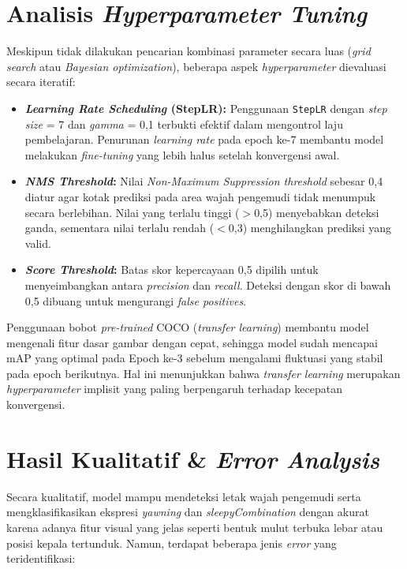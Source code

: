 \documentclass[11pt,a4paper,oneside]{report}
\begin{document}
\section{Analisis \textit{Hyperparameter Tuning}}

Meskipun tidak dilakukan pencarian kombinasi parameter secara luas (\textit{grid search} atau \textit{Bayesian optimization}), beberapa aspek \textit{hyperparameter} dievaluasi secara iteratif:

\begin{itemize}[leftmargin=*]
    \item \textbf{\textit{Learning Rate Scheduling} (StepLR):} Penggunaan \texttt{StepLR} dengan \textit{step size} = 7 dan \textit{gamma} = 0,1 terbukti efektif dalam mengontrol laju pembelajaran. Penurunan \textit{learning rate} pada epoch ke-7 membantu model melakukan \textit{fine-tuning} yang lebih halus setelah konvergensi awal.
    \item \textbf{\textit{NMS Threshold}:} Nilai \textit{Non-Maximum Suppression threshold} sebesar 0,4 diatur agar kotak prediksi pada area wajah pengemudi tidak menumpuk secara berlebihan. Nilai yang terlalu tinggi ($>$0,5) menyebabkan deteksi ganda, sementara nilai terlalu rendah ($<$0,3) menghilangkan prediksi yang valid.
    \item \textbf{\textit{Score Threshold}:} Batas skor kepercayaan 0,5 dipilih untuk menyeimbangkan antara \textit{precision} dan \textit{recall}. Deteksi dengan skor di bawah 0,5 dibuang untuk mengurangi \textit{false positives}.
\end{itemize}

Penggunaan bobot \textit{pre-trained} COCO (\textit{transfer learning}) membantu model mengenali fitur dasar gambar dengan cepat, sehingga model sudah mencapai mAP yang optimal pada Epoch ke-3 sebelum mengalami fluktuasi yang stabil pada epoch berikutnya. Hal ini menunjukkan bahwa \textit{transfer learning} merupakan \textit{hyperparameter} implisit yang paling berpengaruh terhadap kecepatan konvergensi.

\section{Hasil Kualitatif \& \textit{Error Analysis}}

Secara kualitatif, model mampu mendeteksi letak wajah pengemudi serta mengklasifikasikan ekspresi \textit{yawning} dan \textit{sleepyCombination} dengan akurat karena adanya fitur visual yang jelas seperti bentuk mulut terbuka lebar atau posisi kepala tertunduk. Namun, terdapat beberapa jenis \textit{error} yang teridentifikasi:
\end{document}

